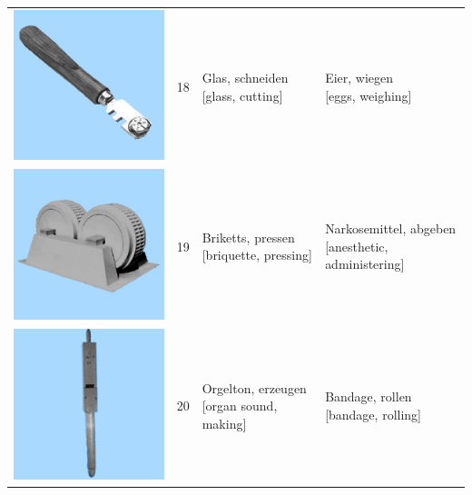 \documentclass[
  english,
  doc,12pt,twoside,floatsintext]{apa7}
\begin{document}
\begin{center}
\begin{ThreePartTable}
{\begin{longtable}{llll}
\includegraphics[valign=c, scale=0.23]{../materials/unfamiliar/18.png} & 18 & \makecell[l]{Glas, schneiden\\{[glass, cutting]}} & \makecell[l]{Eier, wiegen\\{[eggs, weighing]}}\\
\includegraphics[valign=c, scale=0.23]{../materials/unfamiliar/19.png} & 19 & \makecell[l]{Briketts, pressen\\{[briquette, pressing]}} & \makecell[l]{Narkosemittel, abgeben\\{[anesthetic, administering]}}\\
\includegraphics[valign=c, scale=0.23]{../materials/unfamiliar/20.png} & 20 & \makecell[l]{Orgelton, erzeugen\\{[organ sound, making]}} & \makecell[l]{Bandage, rollen\\{[bandage, rolling]}}\\

\end{longtable}}
\end{ThreePartTable}
\end{center}
\end{document}
